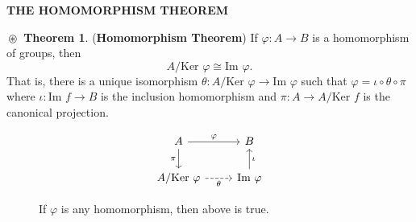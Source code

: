 \documentclass{article}
\theoremstyle{definition}
\newtheorem{theorem}{$\boxed{\boxed{\circledast}}$ Theorem}
\theoremstyle{remark}
\theoremstyle{definition}
\theoremstyle{definition}
\theoremstyle{definition}
\theoremstyle{proof}
\newcommand{\image}[0]{\text{Im }}
\newcommand{\kernel}[0]{\text{Ker }}
\newcommand{\isomorph}{\cong}
\begin{document}
\hrulefill
\textbf{THE HOMOMORPHISM THEOREM}
\hrulefill
\begin{theorem}
	(\textbf{Homomorphism Theorem}) If $ \varphi : A \longrightarrow B $ is a homomorphism of groups, then
	\[A/\kernel \varphi \isomorph \image \varphi.\]
	That is, there is a unique isomorphism $ \theta : A/\kernel \varphi \to \image \varphi $ such that $ \varphi = \iota \circ \theta \circ \pi $ where $ \iota : \image f \to B $ is the inclusion homomorphism and $ \pi : A \to A/\kernel f $ is the canonical projection.
\end{theorem}
\begin{figure}[h!]
	\[
	\begin{tikzcd}
		A \arrow{r}{\varphi} \arrow[swap]{d}{\pi} &B \\
		A/\kernel \varphi \arrow[swap, dashed]{r}{\theta} &\image \varphi \arrow[swap]{u}{\iota}
	\end{tikzcd}
	\]
	\caption{If $ \varphi $ is any homomorphism, then above is true.}
\end{figure}
\end{document}
